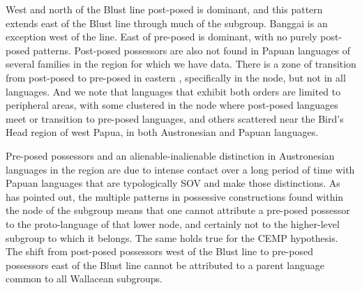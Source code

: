West and north of the Blust line post-posed is dominant,
and this pattern extends east of the Blust line through much
of the  subgroup.
Banggai is an exception west of the line.
East of  pre-posed is dominant,
with no purely post-posed patterns.
Post-posed possessors are also not found in Papuan languages
of several families in the region for which we have data.
There is a zone of transition from post-posed to pre-posed in
eastern , specifically in the  node,
but not in all languages.
And we note that languages that exhibit both orders are limited
to peripheral areas, with some clustered in the 
node where post-posed
languages meet or transition to pre-posed languages,
and others scattered near the Bird’s Head region of west Papua,
in both Austronesian and Papuan languages.

Pre-posed possessors and an alienable-inalienable distinction
in Austronesian languages in the region are due to intense contact
over a long period of time with Papuan languages that are typologically
SOV and make those distinctions.
As \citet{Fricke2019} has pointed out,
the multiple patterns in possessive constructions found within
the  node of the  subgroup
means that one cannot attribute a pre-posed possessor to the
proto-language of that lower node,
and certainly not to the higher-level subgroup to which it belongs.
The same holds true for the CEMP hypothesis.
The shift from post-posed possessors west of the Blust line to
pre-posed possessors east of the Blust line cannot be attributed
to a parent language common to all Wallacean subgroups.